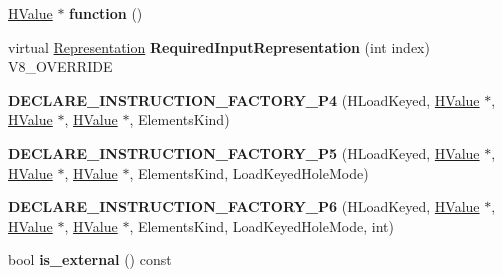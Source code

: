 \begin{DoxyCompactItemize}
\item 
\hypertarget{classv8_1_1internal_1_1_v8___f_i_n_a_l_aafa16c84ec5aa3ee7b4f08e670d6a69f}{}\hyperlink{classv8_1_1internal_1_1_h_value}{H\+Value} $\ast$ {\bfseries function} ()\label{classv8_1_1internal_1_1_v8___f_i_n_a_l_aafa16c84ec5aa3ee7b4f08e670d6a69f}

\item 
\hypertarget{classv8_1_1internal_1_1_v8___f_i_n_a_l_a6c6d1f37f40b113d8f4062f1ffff7215}{}virtual \hyperlink{classv8_1_1internal_1_1_representation}{Representation} {\bfseries Required\+Input\+Representation} (int index) V8\+\_\+\+O\+V\+E\+R\+R\+I\+D\+E\label{classv8_1_1internal_1_1_v8___f_i_n_a_l_a6c6d1f37f40b113d8f4062f1ffff7215}

\item 
\hypertarget{classv8_1_1internal_1_1_v8___f_i_n_a_l_a7dca117af7af744ea18f8898da0e4ed0}{}{\bfseries D\+E\+C\+L\+A\+R\+E\+\_\+\+I\+N\+S\+T\+R\+U\+C\+T\+I\+O\+N\+\_\+\+F\+A\+C\+T\+O\+R\+Y\+\_\+\+P4} (H\+Load\+Keyed, \hyperlink{classv8_1_1internal_1_1_h_value}{H\+Value} $\ast$, \hyperlink{classv8_1_1internal_1_1_h_value}{H\+Value} $\ast$, \hyperlink{classv8_1_1internal_1_1_h_value}{H\+Value} $\ast$, Elements\+Kind)\label{classv8_1_1internal_1_1_v8___f_i_n_a_l_a7dca117af7af744ea18f8898da0e4ed0}

\item 
\hypertarget{classv8_1_1internal_1_1_v8___f_i_n_a_l_a32341a235216f35eb98f0d97423c7ab1}{}{\bfseries D\+E\+C\+L\+A\+R\+E\+\_\+\+I\+N\+S\+T\+R\+U\+C\+T\+I\+O\+N\+\_\+\+F\+A\+C\+T\+O\+R\+Y\+\_\+\+P5} (H\+Load\+Keyed, \hyperlink{classv8_1_1internal_1_1_h_value}{H\+Value} $\ast$, \hyperlink{classv8_1_1internal_1_1_h_value}{H\+Value} $\ast$, \hyperlink{classv8_1_1internal_1_1_h_value}{H\+Value} $\ast$, Elements\+Kind, Load\+Keyed\+Hole\+Mode)\label{classv8_1_1internal_1_1_v8___f_i_n_a_l_a32341a235216f35eb98f0d97423c7ab1}

\item 
\hypertarget{classv8_1_1internal_1_1_v8___f_i_n_a_l_a6b7600928a6a2415602bc6faa8b432ea}{}{\bfseries D\+E\+C\+L\+A\+R\+E\+\_\+\+I\+N\+S\+T\+R\+U\+C\+T\+I\+O\+N\+\_\+\+F\+A\+C\+T\+O\+R\+Y\+\_\+\+P6} (H\+Load\+Keyed, \hyperlink{classv8_1_1internal_1_1_h_value}{H\+Value} $\ast$, \hyperlink{classv8_1_1internal_1_1_h_value}{H\+Value} $\ast$, \hyperlink{classv8_1_1internal_1_1_h_value}{H\+Value} $\ast$, Elements\+Kind, Load\+Keyed\+Hole\+Mode, int)\label{classv8_1_1internal_1_1_v8___f_i_n_a_l_a6b7600928a6a2415602bc6faa8b432ea}

\item 
\hypertarget{classv8_1_1internal_1_1_v8___f_i_n_a_l_a9f31542108be0661ee66c965fbd76110}{}bool {\bfseries is\+\_\+external} () const \label{classv8_1_1internal_1_1_v8___f_i_n_a_l_a9f31542108be0661ee66c965fbd76110}


\end{DoxyCompactItemize}
